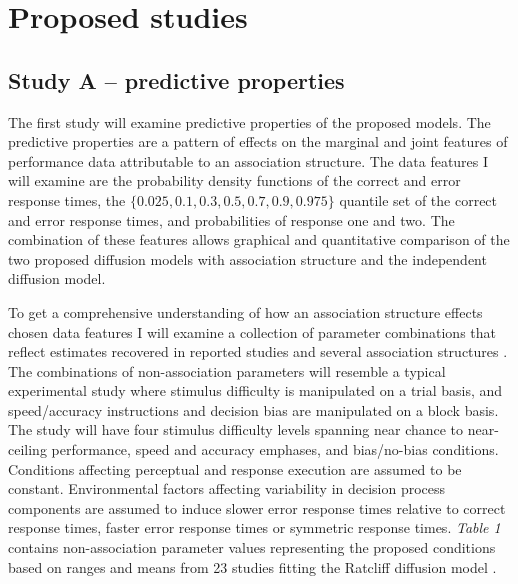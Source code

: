 \documentclass[12pt]{article}
\begin{document}
\section{Proposed studies}
\subsection{Study A – predictive properties}
\indent The first study will examine predictive properties of the proposed models. The predictive properties are a pattern of effects on the marginal and joint features of performance data attributable to an association structure. The data features I will examine are the probability density functions of the correct and error response times, the $\{0.025, 0.1, 0.3, 0.5, 0.7, 0.9, 0.975\}$ quantile set of the correct and error response times, and probabilities of response one and two. The combination of these features allows graphical and quantitative comparison of the two proposed diffusion models with association structure and the independent diffusion model.  

	To get a comprehensive understanding of how an association structure effects chosen data features I will examine a collection of parameter combinations that reflect estimates recovered in reported studies and several association structures \citep{MatWag2009}. The combinations of non-association parameters will resemble a typical experimental study where stimulus difficulty is manipulated on a trial basis, and speed/accuracy instructions and decision bias are manipulated on a block basis. The study will have four stimulus difficulty levels spanning near chance to near-ceiling performance, speed and accuracy emphases, and bias/no-bias conditions. Conditions affecting perceptual and response execution are assumed to be constant. Environmental factors affecting variability in decision process components are assumed to induce slower error response times relative to correct response times, faster error response times or symmetric response times. \emph{Table 1} contains non-association parameter values representing the proposed conditions based on ranges and means from 23 studies fitting the Ratcliff diffusion model \citep{MatWag2009}.
    
\end{document}
